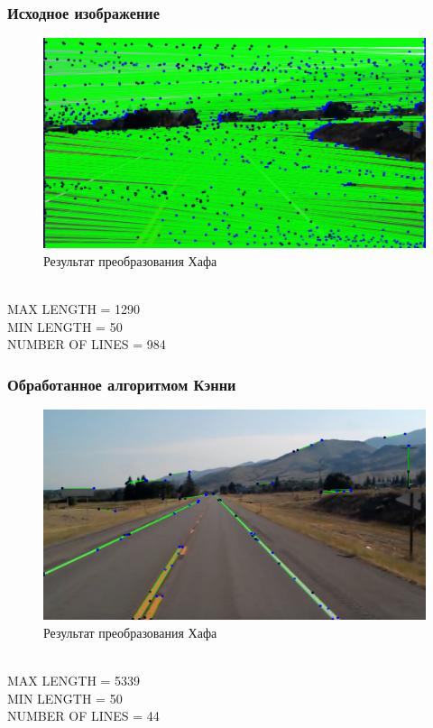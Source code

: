 \subsubsection{Исходное изображение}

\begin{figure}[H]
    \includegraphics[width=\textwidth]{../outputs/image2_ordinary.png}
    \caption{Результат преобразования Хафа}
    \label{fig:image2_ordinary}
\end{figure}
\ \\
MAX LENGTH = 1290 \\
MIN LENGTH = 50 \ \\
NUMBER OF LINES = 984

\subsubsection{Обработанное алгоритмом Кэнни}

\begin{figure}[H]
    \includegraphics[width=\textwidth]{../outputs/image2_canny.png}
    \caption{Результат преобразования Хафа}
    \label{fig:image2_canny}
\end{figure}
\ \\
MAX LENGTH = 5339 \\
MIN LENGTH = 50 \ \\
NUMBER OF LINES = 44


